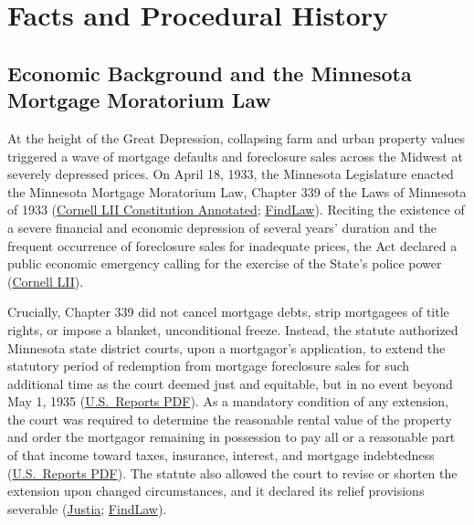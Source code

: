 \documentclass[12pt]{article}
\begin{document}
\section{Facts and Procedural History}

\subsection{Economic Background and the Minnesota Mortgage Moratorium Law}
At the height of the Great Depression, collapsing farm and urban property values triggered a wave of mortgage defaults and foreclosure sales across the Midwest at severely depressed prices. On April 18, 1933, the Minnesota Legislature enacted the Minnesota Mortgage Moratorium Law, Chapter 339 of the Laws of Minnesota of 1933 (\href{https://www.law.cornell.edu/constitution-conan/article-1/section-10/clause-1/contract-clause}{Cornell LII Constitution Annotated}; \href{https://caselaw.findlaw.com/court/us-supreme-court/290/398.html}{FindLaw}). Reciting the existence of a severe financial and economic depression of several years' duration and the frequent occurrence of foreclosure sales for inadequate prices, the Act declared a public economic emergency calling for the exercise of the State's police power (\href{https://www.law.cornell.edu/constitution-conan/article-1/section-10/clause-1/contract-clause}{Cornell LII}).

Crucially, Chapter 339 did not cancel mortgage debts, strip mortgagees of title rights, or impose a blanket, unconditional freeze. Instead, the statute authorized Minnesota state district courts, upon a mortgagor's application, to extend the statutory period of redemption from mortgage foreclosure sales for such additional time as the court deemed just and equitable, but in no event beyond May 1, 1935 (\href{https://tile.loc.gov/storage-services/service/ll/usrep/usrep290/usrep290398/usrep290398.pdf}{U.S.\ Reports PDF}). As a mandatory condition of any extension, the court was required to determine the reasonable rental value of the property and order the mortgagor remaining in possession to pay all or a reasonable part of that income toward taxes, insurance, interest, and mortgage indebtedness (\href{https://tile.loc.gov/storage-services/service/ll/usrep/usrep290/usrep290398/usrep290398.pdf}{U.S.\ Reports PDF}). The statute also allowed the court to revise or shorten the extension upon changed circumstances, and it declared its relief provisions severable (\href{https://supreme.justia.com/cases/federal/us/290/398/}{Justia}; \href{https://caselaw.findlaw.com/court/us-supreme-court/290/398.html}{FindLaw}).
\end{document}
